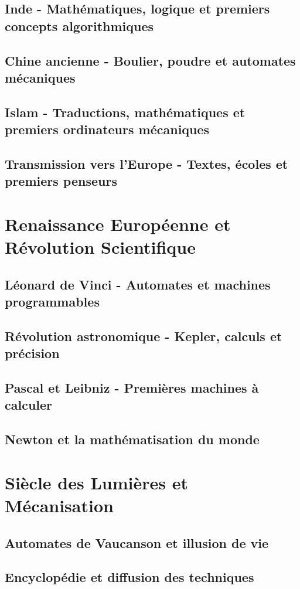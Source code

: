 \documentclass[12pt,a4paper]{book}
\begin{document}
\section{Inde - Mathématiques, logique et premiers concepts algorithmiques}
\section{Chine ancienne - Boulier, poudre et automates mécaniques}
\section{Islam - Traductions, mathématiques et premiers ordinateurs mécaniques}
\section{Transmission vers l'Europe - Textes, écoles et premiers penseurs}

\chapter{Renaissance Européenne et Révolution Scientifique}
\section{Léonard de Vinci - Automates et machines programmables}
\section{Révolution astronomique - Kepler, calculs et précision}
\section{Pascal et Leibniz - Premières machines à calculer}
\section{Newton et la mathématisation du monde}

\chapter{Siècle des Lumières et Mécanisation}
\section{Automates de Vaucanson et illusion de vie}
\section{Encyclopédie et diffusion des techniques}
\end{document}

